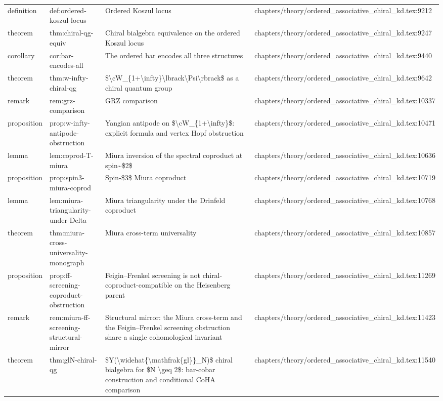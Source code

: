 \documentclass[11pt]{article}
\begin{document}
\begin{longtable}{L{0.10\textwidth}L{0.26\textwidth}L{0.42\textwidth}L{0.22\textwidth}}
definition & def:ordered-koszul-locus & Ordered Koszul locus & chapters/theory/ordered\_associative\_chiral\_kd.tex:9212\\
theorem & thm:chiral-qg-equiv & Chiral bialgebra equivalence on the ordered Koszul locus & chapters/theory/ordered\_associative\_chiral\_kd.tex:9247\\
corollary & cor:bar-encodes-all & The ordered bar encodes all three structures & chapters/theory/ordered\_associative\_chiral\_kd.tex:9440\\
theorem & thm:w-infty-chiral-qg & \$\textbackslash{}cW\_\{1+\textbackslash{}infty\}\textbackslash{}lbrack\textbackslash{}Psi\textbackslash{}rbrack\$ as a chiral quantum group & chapters/theory/ordered\_associative\_chiral\_kd.tex:9642\\
remark & rem:grz-comparison & GRZ comparison & chapters/theory/ordered\_associative\_chiral\_kd.tex:10337\\
proposition & prop:w-infty-antipode-obstruction & Yangian antipode on \$\textbackslash{}cW\_\{1+\textbackslash{}infty\}\$: explicit formula and vertex Hopf obstruction & chapters/theory/ordered\_associative\_chiral\_kd.tex:10471\\
lemma & lem:coprod-T-miura & Miura inversion of the spectral coproduct at spin\textasciitilde{}\$2\$ & chapters/theory/ordered\_associative\_chiral\_kd.tex:10636\\
proposition & prop:spin3-miura-coprod & Spin-\$3\$ Miura coproduct & chapters/theory/ordered\_associative\_chiral\_kd.tex:10719\\
lemma & lem:miura-triangularity-under-Delta & Miura triangularity under the Drinfeld coproduct & chapters/theory/ordered\_associative\_chiral\_kd.tex:10768\\
theorem & thm:miura-cross-universality-monograph & Miura cross-term universality & chapters/theory/ordered\_associative\_chiral\_kd.tex:10857\\
proposition & prop:ff-screening-coproduct-obstruction & Feigin--Frenkel screening is not chiral-coproduct-compatible on the Heisenberg parent & chapters/theory/ordered\_associative\_chiral\_kd.tex:11269\\
remark & rem:miura-ff-screening-structural-mirror & Structural mirror: the Miura cross-term and the Feigin--Frenkel screening obstruction share a single cohomological invariant & chapters/theory/ordered\_associative\_chiral\_kd.tex:11423\\
theorem & thm:glN-chiral-qg & \$Y(\textbackslash{}widehat\{\textbackslash{}mathfrak\{gl\}\}\_N)\$ chiral bialgebra for \$N \textbackslash{}geq 2\$: bar-cobar construction and cond{}itional CoHA comparison & chapters/theory/ordered\_associative\_chiral\_kd.tex:11540\\

\end{longtable}
\end{document}
